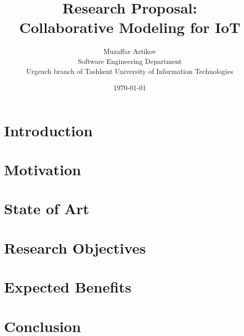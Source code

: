 \documentclass[10pt, oneside]{article}
\title{Research Proposal:\\
Collaborative Modeling for IoT}
\author{Muzaffar Artikov\\
Software Engineering Department\\
Urgench branch of Tashkent University of Information Technologies}
\date{\today}
\begin{document}
\maketitle

\section{Introduction}
\label{sec:introduction}
\section{Motivation}
\label{sec:motivation}
\section{State of Art}
\label{sec:stateofart}
\section{Research Objectives}
\label{sec:researchObjectives}
\section{Expected Benefits}
\label{sec:expectedBenefits}
\section{Conclusion}
\label{sec:conclusion}



\end{document}
